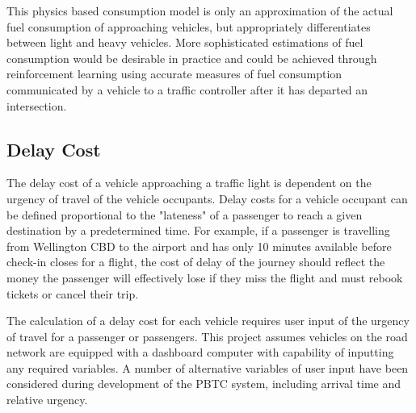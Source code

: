 This physics based consumption model is only an approximation of the actual fuel consumption of approaching vehicles, but appropriately differentiates between light and heavy vehicles. More sophisticated estimations of fuel consumption would be desirable in practice and could be achieved through reinforcement learning using accurate measures of fuel consumption communicated by a vehicle to a traffic controller after it has departed an intersection.


\subsection{Delay Cost}

The delay cost of a vehicle approaching a traffic light is dependent on the urgency of travel of the vehicle occupants. Delay costs for a vehicle occupant can be defined proportional to the "lateness" of a passenger to reach a given destination by a predetermined time. For example, if a passenger is travelling from Wellington CBD to the airport and has only 10 minutes available before check-in closes for a flight, the cost of delay of the journey should reflect the money the passenger will effectively lose if they miss the flight and must rebook tickets or cancel their trip.

The calculation of a delay cost for each vehicle requires user input of the urgency of travel for a passenger or passengers. This project assumes vehicles on the road network are equipped with a dashboard computer with capability of inputting any required variables. A number of alternative variables of user input have been considered during development of the PBTC system, including arrival time and relative urgency. 

